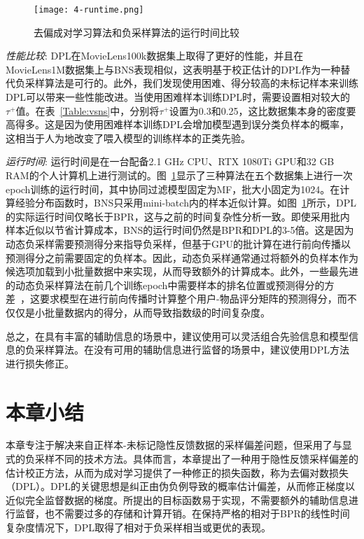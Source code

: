 \begin{figure}[h!]
	\centering
	\texttt{[image: 4-runtime.png]}
	\caption{去偏成对学习算法和负采样算法的运行时间比较} %
	\label{Fig:runtime}
\end{figure}

\textit{性能比较}:
DPL在MovieLens100k数据集上取得了更好的性能，并且在MovieLens1M数据集上与BNS表现相似，这表明基于校正估计的DPL作为一种替代负采样算法是可行的。此外，我们发现使用困难、得分较高的未标记样本来训练DPL可以带来一些性能改进。当使用困难样本训练DPL时，需要设置相对较大的$\tau^+$值。在表~\ref{Table:vsns}中，分别将$\tau^+$设置为0.3和0.25，这比数据集本身的密度要高得多。这是因为使用困难样本训练DPL会增加模型遇到误分类负样本的概率，这相当于人为地改变了喂入模型的训练样本的正类先验。

\textit{运行时间}: 运行时间是在一台配备2.1 GHz CPU、RTX 1080Ti GPU和32 GB RAM的个人计算机上进行测试的。图~\ref{Fig:runtime}显示了三种算法在五个数据集上进行一次epoch训练的运行时间，其中协同过滤模型固定为MF，批大小固定为1024。在计算经验分布函数时，BNS只采用mini-batch内的样本近似计算。如图~\ref{Fig:runtime}所示，DPL的实际运行时间仅略长于BPR，这与之前的时间复杂性分析一致。即使采用批内样本近似以节省计算成本，BNS的运行时间仍然是BPR和DPL的3-5倍。这是因为动态负采样需要预测得分来指导负采样，但基于GPU的批计算在进行前向传播以预测得分之前需要固定的负样本。因此，动态负采样通常通过将额外的负样本作为候选项加载到小批量数据中来实现，从而导致额外的计算成本。此外，一些最先进的动态负采样算法在前几个训练epoch中需要样本的排名位置或预测得分的方差~\cite{Ding:2019:NeurIPS}，这要求模型在进行前向传播时计算整个用户-物品评分矩阵的预测得分，而不仅仅是小批量数据内的得分，从而导致指数级的时间复杂度。

总之，在具有丰富的辅助信息的场景中，建议使用可以灵活组合先验信息和模型信息的负采样算法。在没有可用的辅助信息进行监督的场景中，建议使用DPL方法进行损失修正。
\section{本章小结}
本章专注于解决来自正样本-未标记隐性反馈数据的采样偏差问题，但采用了与显式的负采样不同的技术方法。具体而言，本章提出了一种用于隐性反馈采样偏差的估计校正方法，从而为成对学习提供了一种修正的损失函数，称为去偏对数损失（DPL）。DPL的关键思想是纠正由伪负例导致的概率估计偏差，从而修正梯度以近似完全监督数据的梯度。所提出的目标函数易于实现，不需要额外的辅助信息进行监督，也不需要过多的存储和计算开销。在保持严格的相对于BPR的线性时间复杂度情况下，DPL取得了相对于负采样相当或更优的表现。

